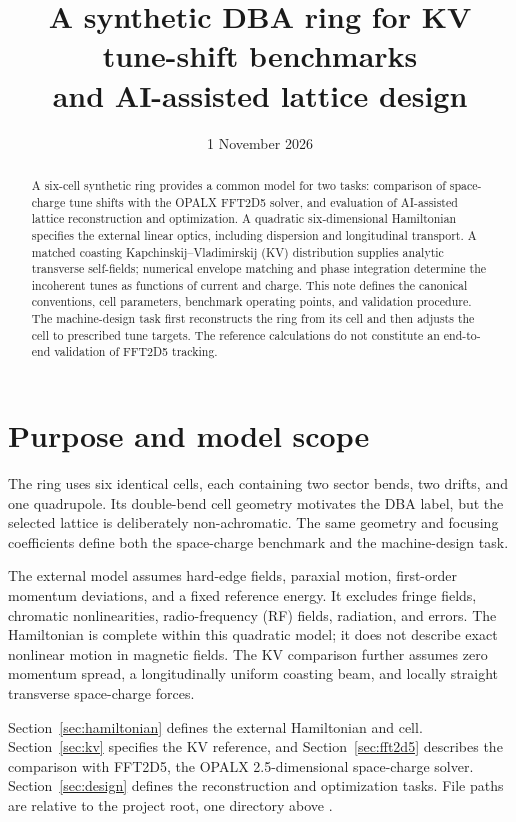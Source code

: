 \documentclass[11pt,a4paper]{article}
\title{A synthetic DBA ring for KV tune-shift benchmarks\\
and AI-assisted lattice design}
\author{}
\date{1 November 2026}
\numberwithin{equation}{section}
\begin{document}
\maketitle

\begin{abstract}
A six-cell synthetic ring provides a common model for two tasks: comparison
of space-charge tune shifts with the OPALX FFT2D5 solver, and evaluation of
AI-assisted lattice reconstruction and optimization. A quadratic
six-dimensional Hamiltonian specifies the external linear optics, including
dispersion and longitudinal transport. A matched coasting
Kapchinskij--Vladimirskij (KV) distribution supplies analytic transverse
self-fields; numerical envelope matching and phase integration determine
the incoherent tunes as functions of current and charge. This note defines
the canonical conventions, cell parameters, benchmark operating points,
and validation procedure. The machine-design task first reconstructs the
ring from its cell and then adjusts the cell to prescribed tune targets.
The reference calculations do not constitute an end-to-end validation of
FFT2D5 tracking.
\end{abstract}

\section{Purpose and model scope}
\label{sec:scope}

The ring uses six identical cells, each containing two sector bends, two
drifts, and one quadrupole. Its double-bend cell geometry motivates the
DBA label, but the selected lattice is deliberately non-achromatic. The
same geometry and focusing coefficients define both the space-charge
benchmark and the machine-design task.

The external model assumes hard-edge fields, paraxial motion,
first-order momentum deviations, and a fixed reference energy. It
excludes fringe fields, chromatic nonlinearities, radio-frequency (RF)
fields, radiation, and errors. The Hamiltonian is complete within this
quadratic model; it does not describe exact nonlinear motion in magnetic
fields. The KV comparison further assumes zero momentum spread, a
longitudinally uniform coasting beam, and locally straight transverse
space-charge forces.

Section~\ref{sec:hamiltonian} defines the external Hamiltonian and cell.
Section~\ref{sec:kv} specifies the KV reference, and
Section~\ref{sec:fft2d5} describes the comparison with FFT2D5, the OPALX
2.5-dimensional space-charge solver. Section~\ref{sec:design} defines the
reconstruction and optimization tasks. File paths are relative to the
project root, one directory above .
\end{document}
